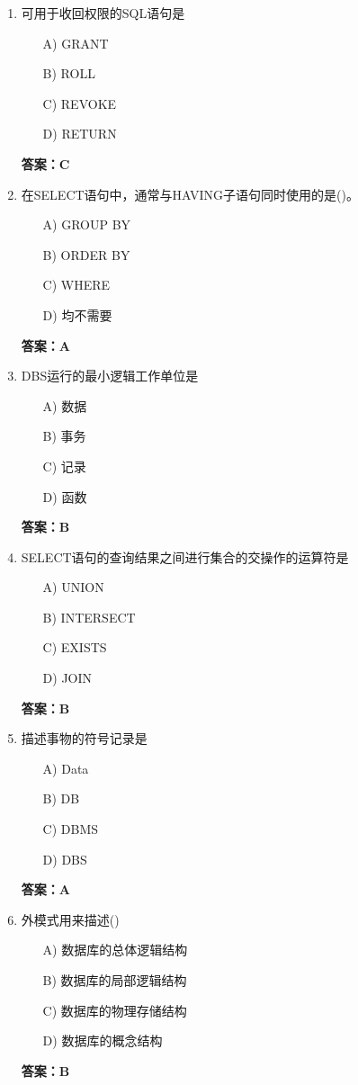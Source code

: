 \documentclass[a4paper,12pt]{article}
\begin{document}
\begin{enumerate}[label=\arabic*.]
\item 可用于收回权限的SQL语句是
\begin{itemize}
    \item[A)] GRANT
    \item[B)] ROLL
    \item[C)] REVOKE
    \item[D)] RETURN
\end{itemize}
\textbf{答案：C}

\item 在SELECT语句中，通常与HAVING子语句同时使用的是()。
\begin{itemize}
    \item[A)] GROUP BY
    \item[B)] ORDER BY
    \item[C)] WHERE
    \item[D)] 均不需要
\end{itemize}
\textbf{答案：A}

\item DBS运行的最小逻辑工作单位是
\begin{itemize}
    \item[A)] 数据
    \item[B)] 事务
    \item[C)] 记录
    \item[D)] 函数
\end{itemize}
\textbf{答案：B}

\item SELECT语句的查询结果之间进行集合的交操作的运算符是
\begin{itemize}
    \item[A)] UNION
    \item[B)] INTERSECT
    \item[C)] EXISTS
    \item[D)] JOIN
\end{itemize}
\textbf{答案：B}

\item 描述事物的符号记录是
\begin{itemize}
    \item[A)] Data
    \item[B)] DB
    \item[C)] DBMS
    \item[D)] DBS
\end{itemize}
\textbf{答案：A}

\item 外模式用来描述()
\begin{itemize}
    \item[A)] 数据库的总体逻辑结构
    \item[B)] 数据库的局部逻辑结构
    \item[C)] 数据库的物理存储结构
    \item[D)] 数据库的概念结构
\end{itemize}
\textbf{答案：B}


\end{enumerate}
\end{document}
